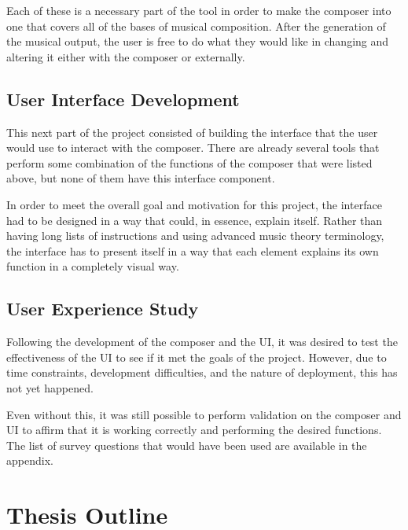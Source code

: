 \vspace{\baselineskip}

Each of these is a necessary part of the tool in order to make the composer into one that covers all of the bases of musical composition.  After the generation of the musical output, the user is free to do what they would like in changing and altering it either with the composer or externally.

\subsection{User Interface Development}
\label{subsec:userinterfacedevelopment}

This next part of the project consisted of building the interface that the user would use to interact with the composer.  There are already several tools that perform some combination of the functions of the composer that were listed above, but none of them have this interface component.

\vspace{\baselineskip}

In order to meet the overall goal and motivation for this project, the interface had to be designed in a way that could, in essence, explain itself.  Rather than having long lists of instructions and using advanced music theory terminology, the interface has to present itself in a way that each element explains its own function in a completely visual way.

\subsection{User Experience Study}
\label{subsec:userexperiencestudy}

Following the development of the composer and the UI, it was desired to test the effectiveness of the UI to see if it met the goals of the project.  However, due to time constraints, development difficulties, and the nature of deployment, this has not yet happened.

\vspace{\baselineskip}

Even without this, it was still possible to perform validation on the composer and UI to affirm that it is working correctly and performing the desired functions.  The list of survey questions that would have been used are available in the appendix.

\section{Thesis Outline}
\label{sec:thesisoutline}

